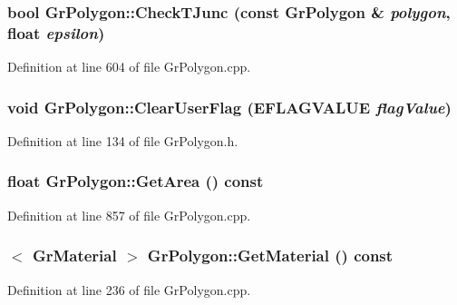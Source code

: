 \begin{CompactItemize}
{\subsubsection[{CheckTJunc}]{\setlength{\rightskip}{0pt plus 5cm}bool GrPolygon::CheckTJunc (const {\bf GrPolygon} \& {\em polygon}, \/  float {\em epsilon})}}
\label{class_gr_polygon_30966480a994228549847bb03e9f1874}




Definition at line 604 of file GrPolygon.cpp.\hypertarget{class_gr_polygon_4e04730f82ed09021a7d6532a0bb5c80}{
\subsubsection[{ClearUserFlag}]{\setlength{\rightskip}{0pt plus 5cm}void GrPolygon::ClearUserFlag ({\bf EFLAGVALUE} {\em flagValue})}}
\label{class_gr_polygon_4e04730f82ed09021a7d6532a0bb5c80}




Definition at line 134 of file GrPolygon.h.\hypertarget{class_gr_polygon_9149e2e595486a8ac0259bc469418c1f}{
\subsubsection[{GetArea}]{\setlength{\rightskip}{0pt plus 5cm}float GrPolygon::GetArea () const}}
\label{class_gr_polygon_9149e2e595486a8ac0259bc469418c1f}




Definition at line 857 of file GrPolygon.cpp.\hypertarget{class_gr_polygon_b4a64686345e7c952395fb5432822f7d}{
\subsubsection[{GetMaterial}]{$<$ {\bf GrMaterial} $>$ GrPolygon::GetMaterial () const}}
\label{class_gr_polygon_b4a64686345e7c952395fb5432822f7d}




Definition at line 236 of file GrPolygon.cpp.\hypertarget{class_gr_polygon_36a40f8b1208bdcf5f39f1ff128bafc5}{
}
\end{CompactItemize}
